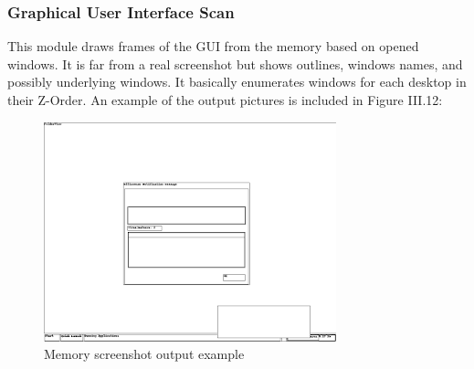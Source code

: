 \subsubsection{Graphical User Interface Scan}
This module draws frames of the GUI from the memory based on opened windows. It is far from a real screenshot but shows outlines, windows names, and possibly underlying windows. It basically enumerates windows for each desktop in their Z-Order. An example of the output pictures is included in Figure III.12:
\begin{figure}[H]
\centering
\includegraphics[width=0.8\columnwidth]{Figures/vol_screen.png}
\caption{Memory screenshot output example}
\end{figure}


